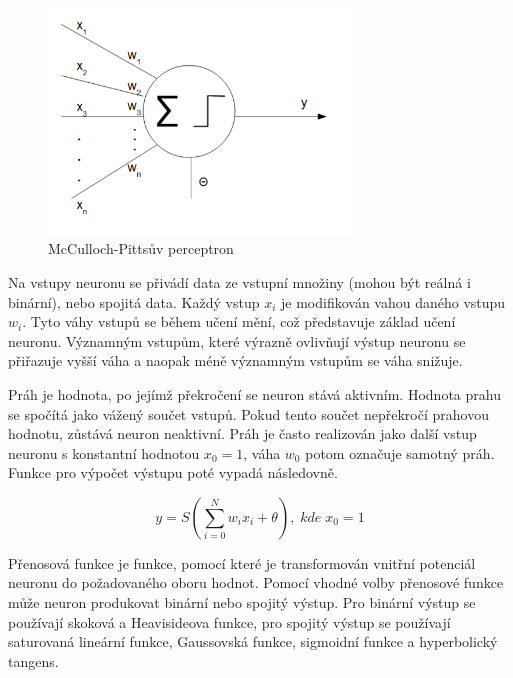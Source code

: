 \documentclass[11pt,twoside,a4paper]{book}
\begin{document}
\begin{figure}[!h]
\begin{center}
\includegraphics[height=6cm]{figures/perceptron.png}
\caption{McCulloch-Pittsův perceptron}
\label{fig:perceptron}
\end{center}
\end{figure}

Na vstupy neuronu se přivádí data ze vstupní množiny (mohou být reálná i binární), nebo spojitá data. Každý vstup \begin{math} x_{i}\end{math} je modifikován vahou daného vstupu \begin{math} w_{i}\end{math}. Tyto váhy vstupů se během učení mění, což představuje základ učení neuronu. Významným vstupům, které výrazně ovlivňují výstup neuronu se přiřazuje vyšší váha a naopak méně významným vstupům se váha snižuje.

Práh je hodnota, po jejímž překročení se neuron stává aktivním. Hodnota prahu se spočítá jako vážený součet vstupů. Pokud tento součet nepřekročí prahovou hodnotu, zůstává neuron neaktivní. Práh je často realizován jako další vstup neuronu s konstantní hodnotou \begin{math} x_{0}=1\end{math}, váha \begin{math} w_{0}\end{math} potom označuje samotný práh. Funkce pro výpočet výstupu poté vypadá následovně.

\begin{equation}
  y=S(\sum\limits_{i=0}^N w_{i}x_{i} + \theta),\; kde\; x_{0}=1
\end{equation}

Přenosová funkce je funkce, pomocí které je transformován vnitřní potenciál neuronu do požadovaného oboru hodnot. Pomocí vhodné volby přenosové funkce může neuron produkovat binární nebo spojitý výstup. Pro binární výstup se používají skoková a Heavisideova funkce, pro spojitý výstup se používají saturovaná lineární funkce, Gaussovská funkce, sigmoidní funkce a hyperbolický tangens.\citep{teoret}
\end{document}
